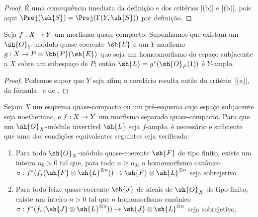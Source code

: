 \documentclass[oneside,10pt]{amsart}
\makeatletter
\renewcommand{\geq}{\geqslant}
\newcommand{\ega@arrow}[2]{\mathchoice{#1}{#2}{#2}{#2}}
\renewcommand{\to}{\ega@arrow{\longrightarrow}{\rightarrow}}
\let\EGAOriginalLabel\label
\renewcommand{\label}[1]{\phantomsection\EGAOriginalLabel{#1}}
\makeatother
\begin{document}
\begin{proof}
É uma consequência imediata da definição  e dos critérios [(b)] e [(b)], pois aqui $\Proj(\sh{S})=\Proj(\Gamma(Y,\sh{S}))$ por definição.
\end{proof}

\begin{corollary}[4.6.7]
\label{II.4.6.7}
Seja $f:X\to Y$ um morfismo quase-compacto.
Suponhamos que existam um $\sh{O}_Y$-módulo quase-coerente $\sh{E}$ e um $Y$-morfismo $g:X\to P=\bb{P}(\sh{E})$ que seja um homeomorfismo do espaço subjacente a $X$ sobre um subespaço de $P$;
então $\sh{L}=g^*(\sh{O}_P(1))$ é $Y$-amplo.
\end{corollary}

\begin{proof}
Podemos supor que $Y$ seja afim;
o corolário resulta então do critério~[(a)], da fórmula~ e de .
\end{proof}

\begin{proposition}[4.6.8]
\label{II.4.6.8}
Sejam $X$ um esquema quase-compacto ou um pré-esquema cujo espaço subjacente seja noetheriano, e $f:X\to Y$ um morfismo separado quase-compacto.
Para que um $\sh{O}_X$-módulo invertível $\sh{L}$ seja $f$-amplo, é necessário e suficiente que uma das condições equivalentes seguintes seja verificada:
\begin{enumerate}
  \item[\rm{(c)}] Para todo $\sh{O}_X$-módulo quase-coerente $\sh{F}$ de tipo finito, existe um inteiro $n_0>0$ tal que, para todo $n\geq n_0$, o homomorfismo canônico $\sigma:f^*(f_*(\sh{F}\otimes\sh{L}^{\otimes n}))\to\sh{F}\otimes\sh{L}^{\otimes n}$ seja sobrejetivo.
  \item[\rm{(c')}] Para todo feixe quase-coerente $\sh{J}$ de ideais de $\sh{O}_X$ de tipo finito, existe um inteiro $n>0$ tal que o homomorfismo canônico $\sigma:f^*(f_*(\sh{J}\otimes\sh{L}^{\otimes n}))\to\sh{J}\otimes\sh{L}^{\otimes n}$ seja sobrejetivo.
\end{enumerate}
\end{proposition}
\end{document}
